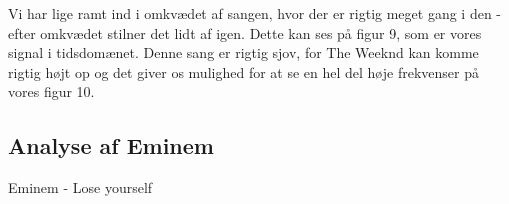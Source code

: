 \documentclass[12pt, letterpaper]{article}
\begin{document}
\begin{figure}[!h]
           \begin{floatrow}
       
           \end{floatrow}
\end{figure}

Vi har lige ramt ind i omkvædet af sangen, hvor der er rigtig meget gang i den - efter omkvædet stilner det lidt af igen. Dette kan ses på figur 9, som er vores signal i tidsdomænet. 
Denne sang er rigtig sjov, for The Weeknd kan komme rigtig højt op og det giver os mulighed for at se en hel del høje frekvenser på vores figur 10. 

\newpage


\subsection{Analyse af Eminem}
Eminem - Lose yourself
\end{document}
